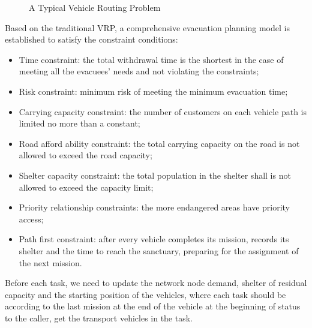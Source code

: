 \documentclass{mcmthesis}
\begin{document}
\begin{figure}[tbp]
  \caption{A Typical Vehicle Routing Problem}\label{Figure3}
\end{figure}

Based on the traditional VRP, a comprehensive evacuation planning model is established to satisfy the constraint conditions:
\begin{itemize}
  \item Time constraint: the total withdrawal time is the shortest in the case of meeting all the evacuees' needs and not violating the constraints;
  \item Risk constraint: minimum risk of meeting the minimum evacuation time;
  \item Carrying capacity constraint: the number of customers on each vehicle path is limited no more than a constant;
  \item Road afford ability constraint: the total carrying capacity on the road is not allowed to exceed the road capacity;
  \item Shelter capacity constraint: the total population in the shelter shall is not allowed to exceed the capacity limit;
  \item Priority relationship constraints: the more endangered areas have priority access;
  \item Path first constraint: after every vehicle completes its mission, records its shelter and the time to reach the sanctuary, preparing for the assignment of the next mission.
\end{itemize}

Before each task, we need to update the network node demand, shelter of residual capacity and the starting position of the vehicles, where each task should be according to the last mission at the end of the vehicle at the beginning of status to the caller, get the transport vehicles in the task.
\end{document}
